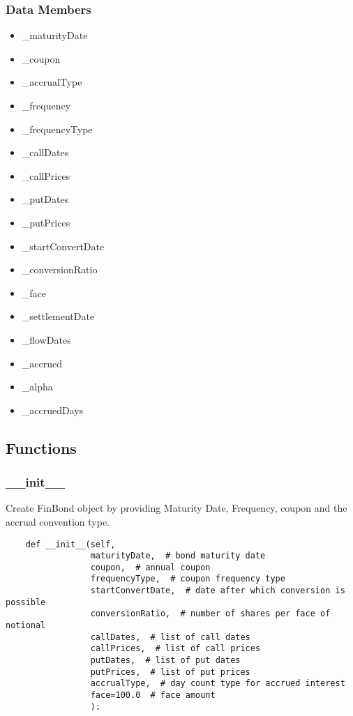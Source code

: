 \documentclass[twoside,11pt]{book}
\begin{document}
\subsubsection*{Data Members}
\begin{itemize}
\item{\_maturityDate}
\item{\_coupon}
\item{\_accrualType}
\item{\_frequency}
\item{\_frequencyType}
\item{\_callDates}
\item{\_callPrices}
\item{\_putDates}
\item{\_putPrices}
\item{\_startConvertDate}
\item{\_conversionRatio}
\item{\_face}
\item{\_settlementDate}
\item{\_flowDates}
\item{\_accrued}
\item{\_alpha}
\item{\_accruedDays}
\end{itemize}

\subsection*{Functions}

\subsubsection*{{\bf \_\_init\_\_}}
Create FinBond object by providing Maturity Date, Frequency, coupon and the accrual convention type.  

\begin{lstlisting}
    def __init__(self,
                 maturityDate,  # bond maturity date
                 coupon,  # annual coupon
                 frequencyType,  # coupon frequency type
                 startConvertDate,  # date after which conversion is possible
                 conversionRatio,  # number of shares per face of notional
                 callDates,  # list of call dates
                 callPrices,  # list of call prices
                 putDates,  # list of put dates
                 putPrices,  # list of put prices
                 accrualType,  # day count type for accrued interest
                 face=100.0  # face amount
                 ):
\end{lstlisting}
\end{document}

